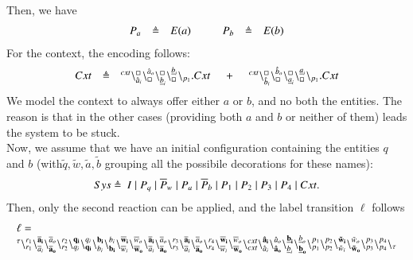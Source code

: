 Then, we have
\[
\begin{array}{lcl @{\hspace{1cm}}lcl}
P_a & \defeq & E(a) & P_b& \defeq & E(b)\\
\end{array}
\]
For the context, the encoding follows:
\[
\begin{array}{lcl @{\hspace{0.5cm}}c@{\hspace{0.5cm}} l}
Cxt &\defeq &  \startchain{cxt}\chainedlink{\hat{a}_i}{\noact}\chainedlink{\noact}{\hat{a}_o}\chainedlink{\underline{b}_i}{\noact}\chainedlink{\noact}{\underline{b}_i}\chainend{p_1}.Cxt
&+
&\startchain{cxt}\chainedlink{\hat{b}_i}{\noact}\chainedlink{\noact}{\hat{b}_o}\chainedlink{\underline{a}_i}{\noact}\chainedlink{\noact}{\underline{a}_i}\chainend{p_1}.Cxt\\
\end{array}
\]
We model the context to always offer either  $a$ or $b$, and no both the entities. The reason is that in
the other cases (providing both $a$ and $b$ or neither of them) leads the system to be stuck.\\
Now, we assume that we have an initial configuration containing the entities $q$ and $b$ (with$\tilde{q},\tilde{w},\tilde{a},\tilde{b}$ grouping all the possibile decorations for these names):
\[
\begin{array}{lcl}
Sys  \defeq \ %
 I\mid P_q \mid \overline{P}_w  \mid  P_a  \mid \overline{P}_b  \mid  P_1  \mid  P_2  \mid  P_3  \mid P_4  \mid Cxt.
\end{array}
\] 
Then, only the second reaction can be applied, and the label transition $\ell$ follows
{\tiny
\[
\begin{array}{l}
\ell = \\
 {}^{\tau}\backslash_{r_1}^{r_1}
 \backslash_{\overline{a}_i}^{\bf  \overline{a}_i}\backslash_{\bf \overline{a}_o}^{\overline{a}_o}\backslash_{r_2}^{r_2}\backslash_{q_i}^{\bf q_i}\backslash_{\bf q_i}^{q_i}\backslash_{b_i}^{\bf b_i}\backslash_{\bf b_i}^{b_i}\backslash_{\overline{w}_i}^{\bf \overline{w}_i}\backslash_{\bf \overline{w}_o}^{\overline{w}_o}\backslash_{\overline{a}_i}^{\bf \overline{a}_i}\backslash_{\bf \overline{a}_o}^{\overline{a}_o}\backslash_{r_3}^{r_3}\backslash_{\overline{a}_i}^{\bf \overline{a}_i}\backslash_{\bf \overline{a}_o}^{\overline{a}_o}\backslash_{r_4}^{r_4}\backslash_{\overline{w}_i}^{\bf \overline{w}_i}\backslash_{\bf \overline{w}_o}^{\overline{w}_o}\backslash_{cxt}^{cxt}\backslash_{\hat{a}_i}^{\bf \hat{a}_i}\backslash_{\bf \hat{a}_o}^{\hat{a}_o}\backslash_{\underline{b}_i}^{\bf \underline{b}_i}\backslash_{\bf \underline{b}_o}^{\underline{b}_o}\backslash_{p_1}^{p_1}\backslash_{p_2}^{p_2}\backslash_{\tilde{w}_i}^{\bf \tilde{w}_i}\backslash_{\bf \tilde{w}_o}^{\tilde{w}_o}\backslash_{p_3}^{p_3}\backslash_{p_4}^{p_4}\backslash_{\tau}
\end{array}
\]}
